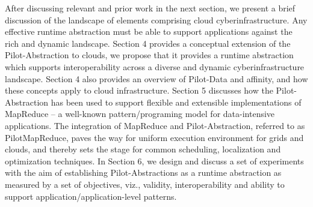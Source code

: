 \documentclass[times]{cpeauth}
\newcommand{\jhanote}[1]{ {\textcolor{red} { ***shantenu: #1 }}}
\newcommand{\jhanote}[1]{}
\newcommand{\pilot}{Pilot\xspace}
\newcommand{\pilotdata}{Pilot-Data\xspace}
\newcommand{\pilotmapreduce}{PilotMapReduce\xspace}
\begin{document}
After discussing relevant and prior work in the next section, we
present a brief discussion of the landscape of elements comprising
cloud cyberinfrastructure. Any effective runtime abstraction must be
able to support applications against the rich and dynamic landscape.
Section 4 provides a conceptual extension of the \pilot-Abstraction to
clouds, we propose that it provides a runtime abstraction which
supports interoperability across a diverse and dynamic
cyberinfrastructure landscape.  Section 4 also provides an overview of
\pilotdata and affinity, and how these concepts apply to cloud
infrastructure. %
Section 5 discusses how the \pilot-Abstraction has been used to
support flexible and extensible implementations of MapReduce -- a
well-known pattern/programing model for data-intensive applications.
The integration of MapReduce and \pilot-Abstraction, referred to as
\pilotmapreduce, paves the way for uniform execution environment for
grids and clouds, and thereby sets the stage for common scheduling,
localization and optimization techniques.  In Section 6, we design and
discuss a set of experiments with the aim of establishing
\pilot-Abstractions as a runtime abstraction as measured by a set of
objectives, viz., validity, interoperability and ability to support
application/application-level patterns.

 



\end{document}
